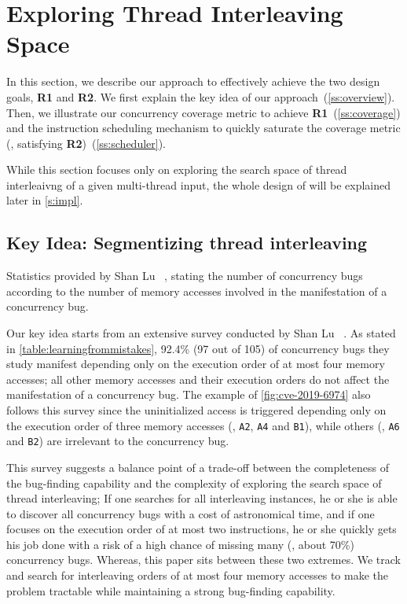 \section{Exploring Thread Interleaving Space}
\label{s:design}

In this section, we describe our approach to effectively achieve the
two design goals, \textbf{R1} and \textbf{R2}.
%
We first explain the key idea of our
approach~(\autoref{ss:overview}). Then, we illustrate our concurrency
coverage metric to achieve \textbf{R1}~(\autoref{ss:coverage}) and the
instruction scheduling mechanism to quickly saturate the coverage
metric (\eg, satisfying \textbf{R2})~(\autoref{ss:scheduler}).


While this section focuses only on exploring the search space of
thread interleaivng of a given multi-thread input, the whole design of
\sys will be explained later in \autoref{s:impl}.


\subsection{Key Idea: Segmentizing thread interleaving}
\label{ss:overview}


\begin{table}[t]
  \centering
  
  \caption{Statistics provided by Shan Lu
    \etal~\cite{learningfrommistakes}, stating the number of
    concurrency bugs according to the number of memory accesses
    involved in the manifestation of a concurrency bug.}
  \label{table:learningfrommistakes}
\end{table}

Our key idea starts from an extensive survey conducted by Shan Lu
\etal~\cite{learningfrommistakes}.
%
As stated in \autoref{table:learningfrommistakes}, 92.4\% (97 out of
105) of concurrency bugs they study manifest depending only on the
execution order of at most four memory accesses; all other memory
accesses and their execution orders do not affect the manifestation of
a concurrency bug.
%
The example of \autoref{fig:cve-2019-6974} also follows this survey
since the uninitialized access is triggered depending only on the
execution order of three memory accesses (\eg, \texttt{A2},
\texttt{A4} and \texttt{B1}), while others (\eg, \texttt{A6} and
\texttt{B2}) are irrelevant to the concurrency bug.


This survey suggests a balance point of a trade-off between the
completeness of the bug-finding capability and the complexity of
exploring the search space of thread interleaving;
%
If one searches for all interleaving instances, he or she is able to
discover all concurrency bugs with a cost of astronomical time, and
if one focuses on the execution order of at most two instructions, he
or she quickly gets his job done with a risk of a high chance of
missing many (\eg, about 70\%) concurrency bugs.
%
Whereas, this paper sits between these two extremes. We track and
search for interleaving orders of at most four memory accesses to make
the problem tractable while maintaining a strong bug-finding
capability.



